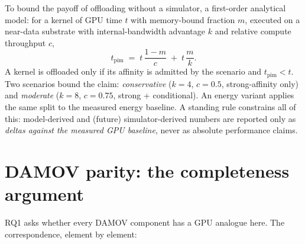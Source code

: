 To bound the payoff of offloading without a simulator, a first-order
analytical model: for a kernel of GPU time $t$ with memory-bound fraction
$m$, executed on a near-data substrate with internal-bandwidth advantage $k$
and relative compute throughput $c$,
\begin{equation}
t_{\text{pim}} \;=\; t\,\frac{1-m}{c} \;+\; t\,\frac{m}{k}.
\label{eq:placement}
\end{equation}
A kernel is offloaded only if its affinity is admitted by the scenario and
$t_{\text{pim}} < t$. Two scenarios bound the claim: \emph{conservative}
($k{=}4$, $c{=}0.5$, strong-affinity only) and \emph{moderate} ($k{=}8$,
$c{=}0.75$, strong + conditional). An energy variant applies the same split
to the measured energy baseline. A standing rule constrains all of this:
model-derived and (future) simulator-derived numbers are reported only as
\emph{deltas against the measured GPU baseline}, never as absolute
performance claims.

\section{DAMOV parity: the completeness argument}
\label{sec:met-parity}

RQ1 asks whether every DAMOV component has a GPU analogue here. The
correspondence, element by element:

